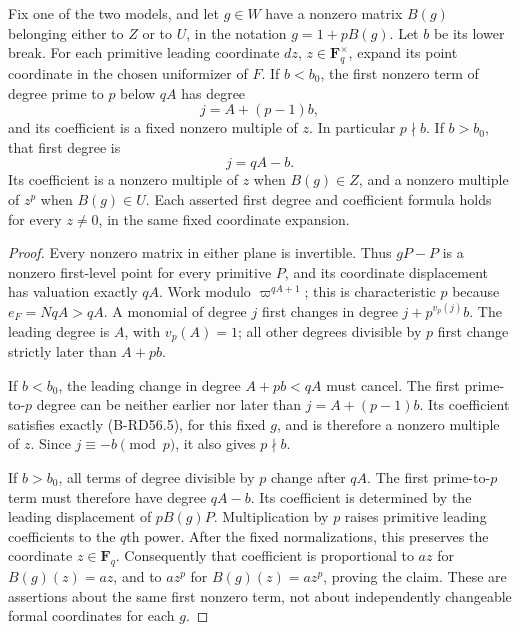 \begin{lemma}
\label{lem:B-RD57-first-term}
Fix one of the two models, and let $g\in W$ have a nonzero matrix
$B(g)$ belonging either to $Z$ or to $U$, in the notation
$g=1+pB(g)$. Let $b$ be its lower break.
For each primitive leading coordinate $d z$, $z\in\mathbf F_q^\times$,
expand its point coordinate in the chosen uniformizer of $F$.
If $b<b_0$, the first nonzero term of degree prime to $p$ below
$qA$ has degree
\[
                     j=A+(p-1)b,
\]
and its coefficient is a fixed nonzero multiple of $z$.
In particular $p\nmid b$.
If $b>b_0$, that first degree is
\[
                         j=qA-b.
\]
Its coefficient is a nonzero multiple of $z$ when $B(g)\in Z$,
and a nonzero multiple of $z^p$ when $B(g)\in U$.
Each asserted first degree and coefficient formula holds for every
$z\ne0$, in the same fixed coordinate expansion.
\end{lemma}
\begin{proof}
Every nonzero matrix in either plane is invertible. Thus $gP-P$
is a nonzero first-level point for every primitive $P$, and its
coordinate displacement has valuation exactly $qA$.
Work modulo $\varpi^{qA+1}$; this is characteristic $p$ because
$e_F=NqA>qA$. A monomial of degree $j$ first changes in degree
$j+p^{v_p(j)}b$. The leading degree is $A$, with $v_p(A)=1$;
all other degrees divisible by $p$ first change strictly later
than $A+pb$.

If $b<b_0$, the leading change in degree $A+pb<qA$ must cancel.
The first prime-to-$p$ degree can be neither earlier nor later
than $j=A+(p-1)b$. Its coefficient satisfies exactly
(B-RD56.5), for this fixed $g$, and is therefore a nonzero
multiple of $z$. Since $j\equiv-b\pmod p$, it also gives
$p\nmid b$.

If $b>b_0$, all terms of degree divisible by $p$ change after
$qA$. The first prime-to-$p$ term must therefore have degree
$qA-b$. Its coefficient is determined by the leading displacement
of $pB(g)P$. Multiplication by $p$ raises primitive leading
coefficients to the $q$th power. After the fixed normalizations,
this preserves the coordinate $z\in\mathbf F_q$. Consequently
that coefficient is proportional to $az$ for $B(g)(z)=az$,
and to $az^p$ for $B(g)(z)=az^p$, proving the claim.
These are assertions about the same first nonzero term, not
about independently changeable formal coordinates for each $g$.
\end{proof}

